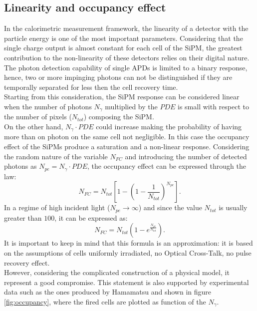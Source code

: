 \subsection{Linearity and occupancy effect}\label{subsec:occupancy_teo}
In the calorimetric measurement framework, the linearity of a detector with the particle energy is one of the most important parameters.
Considering that the single charge output is almost constant for each cell of the SiPM, the greatest contribution to the non-linearity of these detectors relies on their digital nature.\\
The photon detection capability of single APDs is limited to a binary response, hence, two or more impinging photons can not be distinguished if they are temporally separated for less then the cell recovery time.\\
Starting from this consideration, the SiPM response can be considered linear when the number of photons $N_{\gamma}$ multiplied by the $PDE$ is small with respect to the number of pixels ($N_{tot}$) composing the SiPM.\\
On the other hand, $N_{\gamma} \cdot PDE$ could increase making the probability of having more than on photon on the same cell not negligible. In this case the occupancy effect of the SiPMs produce a saturation and a non-linear response.
Considering the random nature of the variable $N_{FC}$ and introducing the number of detected photons as $N_{pe} = N_{\gamma}\cdot PDE$, the occupancy effect can be expressed through the law:
\begin{equation}
    N_{FC} = N_{tot} \left[1 - \left(1-\frac{1}{N_{tot}}\right)^{N_{pe}}\right].
\end{equation}
In a regime of high incident light ($N_{pe}\rightarrow \infty$) and since the value $N_{tot}$ is usually greater than $100$, it can be expressed as:
\begin{equation}
    N_{FC} = N_{tot} \left(1 - e^\frac{N_{pe}}{N_{tot}}\right).
\end{equation}
It is important to keep in mind that this formula is an approximation: it is based on the assumptions of cells uniformly irradiated, no Optical Cross-Talk, no pulse recovery effect.\\
However, considering the complicated construction of a physical model, it represent a good compromise. This statement is also supported by experimental data such as the ones produced by Hamamatsu and shown in figure \ref{fig:occupancy}, where the fired cells are plotted as function of the $N_{\gamma}$.

